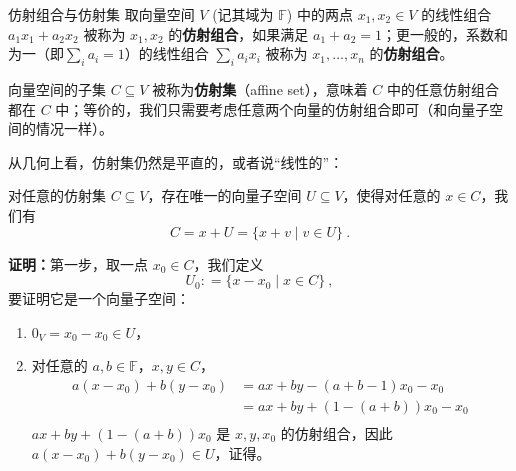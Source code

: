 
\begin{issues}
\issueDraft
\end{issues}



\begin{definition}{仿射组合与仿射集}
取向量空间 $V$ (记其域为 $\mathbb{F}$) 中的两点 $x_1, x_2 \in V$ 的线性组合 $a_1 x_1 + a_2 x_2$ 被称为 $x_1, x_2$ 的\textbf{仿射组合}，如果满足 $a_1 + a_2 = 1$；更一般的，系数和为一（即$\sum_i a_i = 1$）的线性组合 $\sum_i a_i x_i$ 被称为 $x_1, \dots, x_n$ 的\textbf{仿射组合}。

向量空间的子集 $C \subseteq V$ 被称为\textbf{仿射集}（affine set），意味着 $C$ 中的任意仿射组合都在 $C$ 中；等价的，我们只需要考虑任意两个向量的仿射组合即可（和向量子空间的情况一样）。
\end{definition}

从几何上看，仿射集仍然是平直的，或者说“线性的”：

\begin{theorem}{}
对任意的仿射集 $C \subseteq V$，存在唯一的向量子空间 $U \subseteq V$，使得对任意的 $x \in C$，我们有
\begin{equation}
C = x + U = \{ x + v \mid v \in U\}~.
\end{equation}
\end{theorem}

\textbf{证明：}第一步，取一点 $x_0 \in C$，我们定义
\begin{equation}
U_0: = \{ x - x_0 \mid x \in C \}~,
\end{equation}
要证明它是一个向量子空间：
\begin{enumerate}
\item $0_V = x_0 - x_0 \in U$，
\item 对任意的 $a, b \in \mathbb{F}$，$x, y \in C$，
    \begin{equation}
    \begin{aligned}
    a (x - x_0) + b (y - x_0) &= a x + b y - (a + b - 1) x_0 - x_0 \\
    &= a x + b y + (1 - (a + b)) x_0 - x_0 \\
    \end{aligned}~
    \end{equation}
$a x + b y + (1 - (a + b)) x_0$ 是 $x, y, x_0$ 的仿射组合，因此 $a (x - x_0) + b (y - x_0) \in U$，证得。
\end{enumerate}

